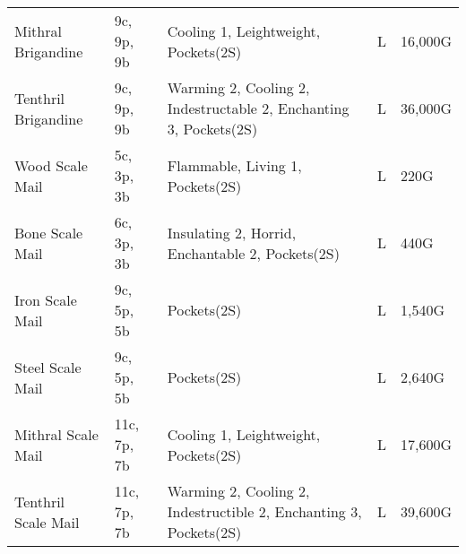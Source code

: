 \begin{longtable}{p{3.5cm} | p{1.5cm} | p{5cm} | p{1cm} | p{1.25cm}}
	Mithral Brigandine & 9c, 9p, 9b & Cooling 1, Leightweight, Pockets(2S) & L & 16,000G\\
	
	Tenthril Brigandine & 9c, 9p, 9b & Warming 2, Cooling 2, Indestructable 2, Enchanting 3, Pockets(2S) & L & 36,000G\\
	
	Wood Scale Mail & 5c, 3p, 3b & Flammable, Living 1, Pockets(2S) & L & 220G\\
	
	Bone Scale Mail & 6c, 3p, 3b & Insulating 2, Horrid, Enchantable 2, Pockets(2S) & L & 440G\\
	
	Iron Scale Mail & 9c, 5p, 5b & Pockets(2S) & L & 1,540G\\
	
	Steel Scale Mail & 9c, 5p, 5b & Pockets(2S) & L & 2,640G\\
	
	Mithral Scale Mail & 11c, 7p, 7b & Cooling 1, Leightweight, Pockets(2S) & L & 17,600G\\
	
	Tenthril Scale Mail & 11c, 7p, 7b & Warming 2, Cooling 2, Indestructible 2, Enchanting 3, Pockets(2S) & L & 39,600G\\
\end{longtable}
